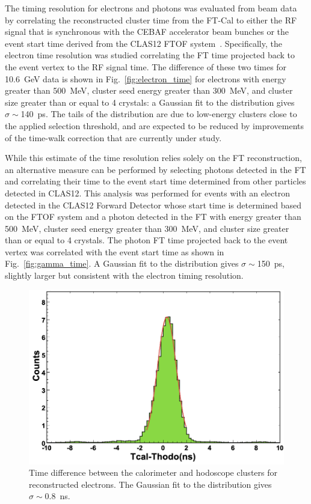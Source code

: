 The timing resolution for electrons and photons was evaluated from beam data by correlating the reconstructed
cluster time from the FT-Cal to either the RF signal that is synchronous with the CEBAF accelerator beam bunches
or the event start time derived from the CLAS12 FTOF system~\cite{ftof}. Specifically, the electron time resolution
was studied correlating the FT time projected back to the event vertex to the RF signal time. The difference of
these two times for 10.6~GeV data is shown in Fig.~\ref{fig:electron_time} for electrons with energy greater than
500~MeV, cluster seed energy greater than 300~MeV, and cluster size greater than or equal to 4 crystals: a
Gaussian fit to the distribution gives $\sigma \sim$140~ps. The tails of the distribution are due to low-energy
clusters close to the applied selection threshold, and are expected to be reduced by improvements of the time-walk
correction that are currently under study.

While this estimate of the time resolution relies solely on the FT reconstruction, an alternative measure can be
performed by selecting photons detected in the FT and correlating their time to the event start time determined
from other particles detected in CLAS12. This analysis was performed for events with an electron detected in the
CLAS12 Forward Detector whose start time is determined based on the FTOF system and a photon detected in the
FT with energy greater than 500~MeV, cluster seed energy greater than 300~MeV, and cluster size greater than
or equal to 4 crystals. The photon FT time projected back to the event vertex was correlated with the event start
time as shown in Fig.~\ref{fig:gamma_time}. A Gaussian fit to the distribution gives $\sigma \sim$150~ps, slightly
larger but consistent with the electron timing resolution.

\begin{figure}[h]
  \centering
\includegraphics[height=0.6\columnwidth]{fig/ftcalhodo_time.png}
\caption{Time difference between the calorimeter and hodoscope clusters for reconstructed electrons. The
  Gaussian fit to the distribution gives $\sigma \sim$0.8~ns.}
\label{fig:ftcalhodo_time}
\end{figure}

